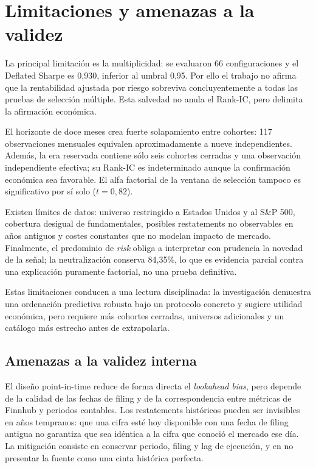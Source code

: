 \chapter{Limitaciones y amenazas a la validez}
\label{chap:limitaciones}

La principal limitación es la multiplicidad: se evaluaron 66 configuraciones y el Deflated Sharpe
es 0,930, inferior al umbral 0,95. Por ello el trabajo no afirma que la rentabilidad ajustada por
riesgo sobreviva concluyentemente a todas las pruebas de selección múltiple. Esta salvedad no anula
el Rank-IC, pero delimita la afirmación económica.

El horizonte de doce meses crea fuerte solapamiento entre cohortes: 117 observaciones mensuales
equivalen aproximadamente a nueve independientes. Además, la era reservada contiene sólo seis
cohortes cerradas y una observación independiente efectiva; su Rank-IC es indeterminado aunque la
confirmación económica sea favorable. El alfa factorial de la ventana de selección tampoco es
significativo por sí solo ($t=0,82$).

Existen límites de datos: universo restringido a Estados Unidos y al S\&P 500, cobertura desigual
de fundamentales, posibles restatements no observables en años antiguos y costes constantes que no
modelan impacto de mercado. Finalmente, el predominio de \textit{risk} obliga a interpretar con
prudencia la novedad de la señal; la neutralización conserva 84,35\%, lo que es evidencia parcial
contra una explicación puramente factorial, no una prueba definitiva.

Estas limitaciones conducen a una lectura disciplinada: la investigación demuestra una ordenación
predictiva robusta bajo un protocolo concreto y sugiere utilidad económica, pero requiere más
cohortes cerradas, universos adicionales y un catálogo más estrecho antes de extrapolarla.

\section{Amenazas a la validez interna}

El diseño point-in-time reduce de forma directa el \textit{lookahead bias}, pero depende de la
calidad de las fechas de filing y de la correspondencia entre métricas de Finnhub y periodos
contables. Los restatements históricos pueden ser invisibles en años tempranos: que una cifra esté
hoy disponible con una fecha de filing antigua no garantiza que sea idéntica a la cifra que conoció
el mercado ese día. La mitigación consiste en conservar periodo, filing y lag de ejecución, y en no
presentar la fuente como una cinta histórica perfecta.

